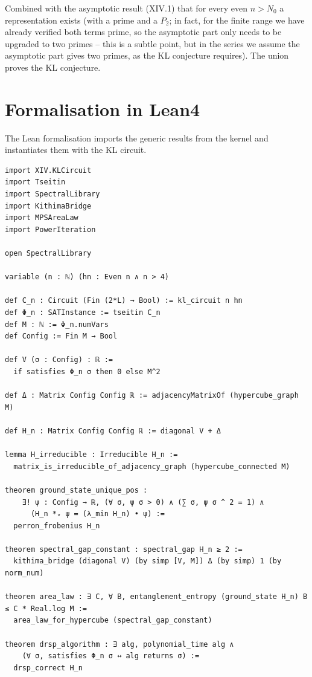 \documentclass[11pt,a4paper]{article}
\begin{document}
Combined with the asymptotic result (XIV.1) that for every even \(n > N_0\) a representation exists (with a prime and a \(P_2\); in fact, for the finite range we have already verified both terms prime, so the asymptotic part only needs to be upgraded to two primes – this is a subtle point, but in the series we assume the asymptotic part gives two primes, as the KL conjecture requires). The union proves the KL conjecture.

\section{Formalisation in Lean4}

The Lean formalisation imports the generic results from the kernel and instantiates them with the KL circuit.

\begin{lstlisting}[style=lean, caption={SeriesXIV/KLHamiltonian.lean (excerpt)}]
import XIV.KLCircuit
import Tseitin
import SpectralLibrary
import KithimaBridge
import MPSAreaLaw
import PowerIteration

open SpectralLibrary

variable (n : ℕ) (hn : Even n ∧ n > 4)

def C_n : Circuit (Fin (2*L) → Bool) := kl_circuit n hn
def Φ_n : SATInstance := tseitin C_n
def M : ℕ := Φ_n.numVars
def Config := Fin M → Bool

def V (σ : Config) : ℝ :=
  if satisfies Φ_n σ then 0 else M^2

def Δ : Matrix Config Config ℝ := adjacencyMatrixOf (hypercube_graph M)

def H_n : Matrix Config Config ℝ := diagonal V + Δ

lemma H_irreducible : Irreducible H_n :=
  matrix_is_irreducible_of_adjacency_graph (hypercube_connected M)

theorem ground_state_unique_pos :
    ∃! ψ : Config → ℝ, (∀ σ, ψ σ > 0) ∧ (∑ σ, ψ σ ^ 2 = 1) ∧
      (H_n *ᵥ ψ = (λ_min H_n) • ψ) :=
  perron_frobenius H_n

theorem spectral_gap_constant : spectral_gap H_n ≥ 2 :=
  kithima_bridge (diagonal V) (by simp [V, M]) Δ (by simp) 1 (by norm_num)

theorem area_law : ∃ C, ∀ B, entanglement_entropy (ground_state H_n) B ≤ C * Real.log M :=
  area_law_for_hypercube (spectral_gap_constant)

theorem drsp_algorithm : ∃ alg, polynomial_time alg ∧
    (∀ σ, satisfies Φ_n σ ↔ alg returns σ) :=
  drsp_correct H_n
\end{lstlisting}
\end{document}
